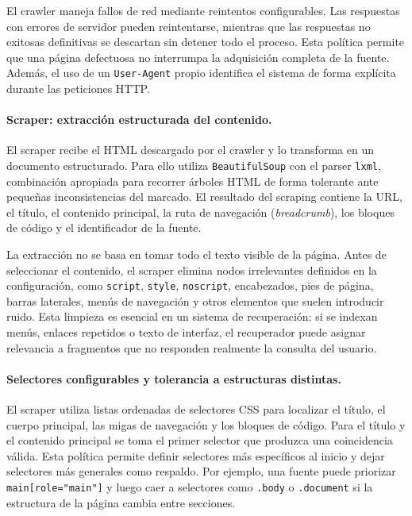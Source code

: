 \documentclass[11pt]{article}
\begin{document}
El crawler maneja fallos de red mediante reintentos configurables. Las respuestas con errores de
servidor pueden reintentarse, mientras que las respuestas no exitosas definitivas se descartan sin
detener todo el proceso. Esta política permite que una página defectuosa no interrumpa la
adquisición completa de la fuente. Además, el uso de un \texttt{User-Agent} propio identifica el
sistema de forma explícita durante las peticiones HTTP.

\paragraph{Scraper: extracción estructurada del contenido.}
El scraper recibe el HTML descargado por el crawler y lo transforma en un documento estructurado.
Para ello utiliza \texttt{BeautifulSoup} con el parser \texttt{lxml}, combinación apropiada para
recorrer árboles HTML de forma tolerante ante pequeñas inconsistencias del marcado. El resultado
del scraping contiene la URL, el título, el contenido principal, la ruta de navegación
(\emph{breadcrumb}), los bloques de código y el identificador de la fuente.

La extracción no se basa en tomar todo el texto visible de la página. Antes de seleccionar el
contenido, el scraper elimina nodos irrelevantes definidos en la configuración, como
\texttt{script}, \texttt{style}, \texttt{noscript}, encabezados, pies de página, barras laterales,
menús de navegación y otros elementos que suelen introducir ruido. Esta limpieza es esencial en
un sistema de recuperación: si se indexan menús, enlaces repetidos o texto de interfaz, el
recuperador puede asignar relevancia a fragmentos que no responden realmente la consulta del
usuario.

\paragraph{Selectores configurables y tolerancia a estructuras distintas.}
El scraper utiliza listas ordenadas de selectores CSS para localizar el título, el cuerpo principal,
las migas de navegación y los bloques de código. Para el título y el contenido principal se toma el
primer selector que produzca una coincidencia válida. Esta política permite definir selectores más
específicos al inicio y dejar selectores más generales como respaldo. Por ejemplo, una fuente puede
priorizar \texttt{main[role="main"]} y luego caer a selectores como \texttt{.body} o
\texttt{.document} si la estructura de la página cambia entre secciones.
\end{document}
